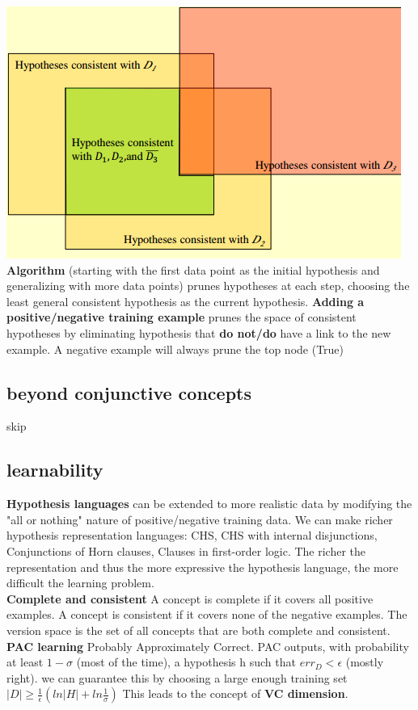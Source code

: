 \documentclass[cheatsheet.tex]{subfiles}
\begin{document}
\includegraphics[width=.8\linewidth]{venn.png}
\\
\textbf{Algorithm} (starting with the first data point as the initial hypothesis and generalizing with more data points) prunes hypotheses at each step, choosing the least general consistent hypothesis as the current hypothesis. \textbf{Adding a positive/negative training example} prunes the space of consistent hypotheses by eliminating hypothesis that \textbf{do not/do} have a link to the new example. A negative example will always prune the top node (True)
\subsection{beyond conjunctive concepts}
skip
\subsection{learnability}
\textbf{Hypothesis languages} can be extended to more realistic data by modifying the "all or nothing" nature of positive/negative training data. We can make richer hypothesis representation languages: CHS, CHS with internal disjunctions, Conjunctions of Horn clauses, Clauses in first-order logic. The richer the representation and thus the more expressive the hypothesis language, the more difficult the learning problem. 
\\
\textbf{Complete and consistent} A concept is complete if it covers all positive examples. A concept is consistent if it covers none of the negative examples. The version space is the set of all
concepts that are both complete and consistent. 
\\
\textbf{PAC learning} Probably Approximately Correct. PAC outputs, with probability at least $1-\sigma$ (most of the time), a hypothesis h such that $err_D < \epsilon$ (mostly right). we can guarantee this by choosing a large enough training set $|D| \geq \frac{1}{\epsilon}(ln|H|+ln\frac{1}{\sigma})$ This leads to the concept of \textbf{VC dimension}. 
\end{document}
